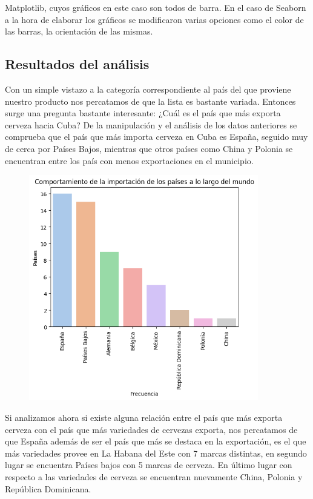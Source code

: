 \documentclass[a4paper,12pt]{article}
\begin{document}
Matplotlib, cuyos gráficos en este caso son todos de barra. En el caso de Seaborn a la hora de elaborar los gráficos se modificaron varias opciones como el color de las barras, la orientación de las mismas.
		\subsection{Resultados del análisis}
		Con un simple vistazo a la categoría correspondiente al país del que proviene nuestro producto nos percatamos de que la lista es bastante variada. Entonces surge una pregunta bastante interesante: ¿Cuál es el país que más exporta cerveza hacia Cuba? De la manipulación y el análisis de los datos anteriores se comprueba que el país que más importa cerveza en Cuba es España, seguido muy de cerca por Países Bajos, mientras que otros países como China y Polonia se encuentran entre los país con menos exportaciones en el municipio.
		
		\begin{figure}[h]
			\centering
			\includegraphics[width=10cm]{export.png}
			\label{fig:Comportamiento de la exportación de cerveza por países}
		\end{figure}
		Si analizamos ahora si existe alguna relación entre el país que más exporta cerveza con el país que más variedades de cervezas exporta, nos percatamos de que España además de ser el país que más se destaca en la exportación, es el que más variedades provee en La Habana del Este con 7 marcas distintas, en segundo lugar se encuentra Países bajos con 5 marcas de cerveza. En último lugar con respecto a las variedades de cerveza se encuentran nuevamente China, Polonia y República Dominicana.
		
\end{document}

